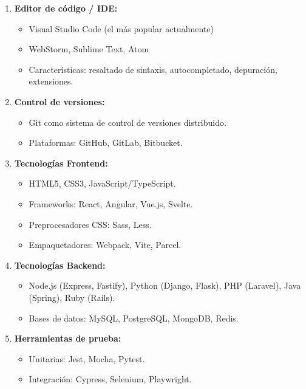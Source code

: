 \documentclass[12pt,letterpaper]{article}
\begin{document}
\begin{enumerate}
    \item \textbf{Editor de c\'odigo / IDE:}
    \begin{itemize}
        \item Visual Studio Code (el m\'as popular actualmente)
        \item WebStorm, Sublime Text, Atom
        \item Caracter\'isticas: resaltado de sintaxis, autocompletado, depuraci\'on, extensiones.
    \end{itemize}
    
    \item \textbf{Control de versiones:}
    \begin{itemize}
        \item Git como sistema de control de versiones distribuido.
        \item Plataformas: GitHub, GitLab, Bitbucket.
    \end{itemize}
    
    \item \textbf{Tecnolog\'ias Frontend:}
    \begin{itemize}
        \item HTML5, CSS3, JavaScript/TypeScript.
        \item Frameworks: React, Angular, Vue.js, Svelte.
        \item Preprocesadores CSS: Sass, Less.
        \item Empaquetadores: Webpack, Vite, Parcel.
    \end{itemize}
    
    \item \textbf{Tecnolog\'ias Backend:}
    \begin{itemize}
        \item Node.js (Express, Fastify), Python (Django, Flask), PHP (Laravel), Java (Spring), Ruby (Rails).
        \item Bases de datos: MySQL, PostgreSQL, MongoDB, Redis.
    \end{itemize}
    
    \item \textbf{Herramientas de prueba:}
    \begin{itemize}
        \item Unitarias: Jest, Mocha, Pytest.
        \item Integraci\'on: Cypress, Selenium, Playwright.
    \end{itemize}
    

\end{enumerate}
\end{document}
